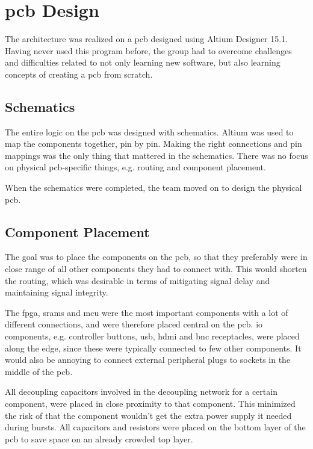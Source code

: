 \section{\gls{pcb} Design}
The architecture was realized on a \gls{pcb} designed using Altium Designer 15.1.
Having never used this program before, the group had to overcome challenges and difficulties related to not only learning new software, but also learning concepts of creating a \gls{pcb} from scratch. 

\subsection{Schematics}
The entire logic on the \gls{pcb} was designed with schematics. 
Altium was used to map the components together, pin by pin. 
Making the right connections and pin mappings was the only thing that mattered in the schematics. 
There was no focus on physical \gls{pcb}-specific things, e.g. routing and component placement.

When the schematics were completed, the team moved on to design the physical \gls{pcb}.

\subsection{Component Placement}
The goal was to place the components on the \gls{pcb}, so that they preferably were in close range of all other components they had to connect with. 
This would shorten the routing, which was desirable in terms of mitigating signal delay and maintaining signal integrity.

The \gls{fpga}, \gls{sram}s and \gls{mcu} were the most important components with a lot of different connections, and were therefore placed central on the \gls{pcb}.
\gls{io} components, e.g. controller buttons, \gls{usb}, \gls{hdmi} and \gls{bnc} receptacles, were placed along the edge, since these were typically connected to few other components.
It would also be annoying to connect external peripheral plugs to sockets in the middle of the \gls{pcb}.

All decoupling capacitors involved in the decoupling network for a certain component, were placed in close proximity to that component.
This minimized the risk of that the component wouldn't get the extra power supply it needed during bursts.
All capacitors and resistors were placed on the bottom layer of the \gls{pcb} to save space on an already crowded top layer.

